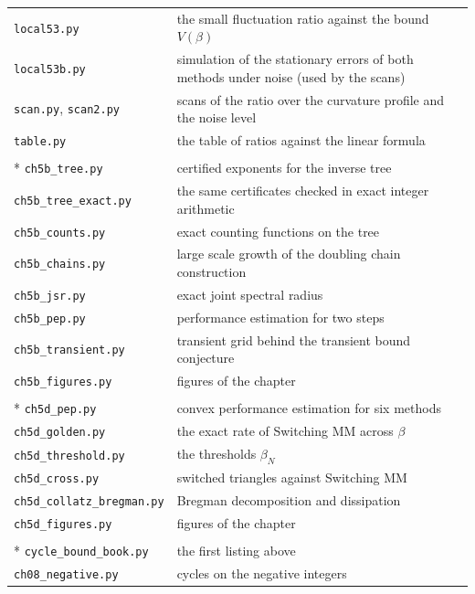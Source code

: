 {\begin{longtable}{@{}l>{\raggedright\arraybackslash}p{}@{}}
\texttt{local53.py} & the small fluctuation ratio against the bound $V(\beta)$ \\
\texttt{local53b.py} & simulation of the stationary errors of both methods under noise (used by the scans) \\
\texttt{scan.py}, \texttt{scan2.py} & scans of the ratio over the curvature profile and the noise level \\
\texttt{table.py} & the table of ratios against the linear formula \\
\addlinespace[4pt]
\multicolumn{2}{@{}l}{\itshape\Cref{chap:difference}} \\*
\texttt{ch5b\_tree.py} & certified exponents for the inverse tree \\
\texttt{ch5b\_tree\_exact.py} & the same certificates checked in exact integer arithmetic \\
\texttt{ch5b\_counts.py} & exact counting functions on the tree \\
\texttt{ch5b\_chains.py} & large scale growth of the doubling chain construction \\
\texttt{ch5b\_jsr.py} & exact joint spectral radius \\
\texttt{ch5b\_pep.py} & performance estimation for two steps \\
\texttt{ch5b\_transient.py} & transient grid behind the transient bound conjecture \\
\texttt{ch5b\_figures.py} & figures of the chapter \\
\addlinespace[4pt]
\multicolumn{2}{@{}l}{\itshape\Cref{chap:threepoint}} \\*
\texttt{ch5d\_pep.py} & convex performance estimation for six methods \\
\texttt{ch5d\_golden.py} & the exact rate of Switching MM across $\beta$ \\
\texttt{ch5d\_threshold.py} & the thresholds $\beta_N$ \\
\texttt{ch5d\_cross.py} & switched triangles against Switching MM \\
\texttt{ch5d\_collatz\_bregman.py} & Bregman decomposition and dissipation \\
\texttt{ch5d\_figures.py} & figures of the chapter \\
\addlinespace[4pt]
\multicolumn{2}{@{}l}{\itshape\Cref{chap:cycles}} \\*
\texttt{cycle\_bound\_book.py} & the first listing above \\
\texttt{ch08\_negative.py} & cycles on the negative integers \\

\end{longtable}}
